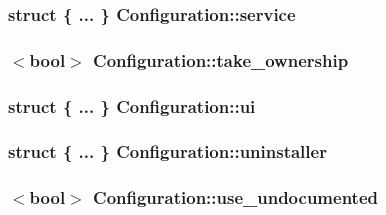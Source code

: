 \subsubsection[{service}]{\setlength{\rightskip}{0pt plus 5cm}struct \{ ... \}   Configuration\-::service}\label{class_configuration_a32cc3bce5634709d4e715d3e3bdce2f8}
\subsubsection[{take\-\_\-ownership}]{$<$bool$>$ Configuration\-::take\-\_\-ownership}\label{class_configuration_a1e196e7aa1b3290b9db4ad56f25eb2bc}
\subsubsection[{ui}]{\setlength{\rightskip}{0pt plus 5cm}struct \{ ... \}   Configuration\-::ui}\label{class_configuration_a773fe8c81358ff346925ed7e761eb06f}
\subsubsection[{uninstaller}]{\setlength{\rightskip}{0pt plus 5cm}struct \{ ... \}   Configuration\-::uninstaller}\label{class_configuration_a3df7bf4e745ba524e2b19ee390ca1847}
\subsubsection[{use\-\_\-undocumented}]{$<$bool$>$ Configuration\-::use\-\_\-undocumented}\label{class_configuration_a3aaa756f0c12aa741275eec9e11e5396}
